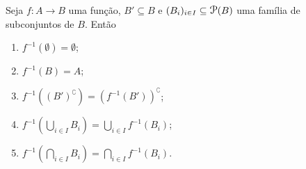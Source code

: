 \begin{prop}
\label{prop:props.imag.inv}
	Seja $f: A \to B$ uma função, $B' \subseteq B$ e $(B_i)_{i \in I} \subseteq \p(B)$ uma família de subconjuntos de $B$. Então
	\begin{enumerate}
	\item $f^{-1}(\emptyset) = \emptyset$;
	\item $f^{-1}(B) = A$;
	\item $f^{-1}\left((B')^\complement\right) = (f^{-1}(B'))^\complement$;
	\item $f^{-1}\left(\displaystyle\bigcup_{i \in I} B_i\right) = \displaystyle\bigcup_{i \in I} f^{-1}(B_i)$;
	\item $f^{-1}\left(\displaystyle\bigcap_{i \in I} B_i\right) = \displaystyle\bigcap_{i \in I} f^{-1}(B_i)$.
	\end{enumerate}
\end{prop}
